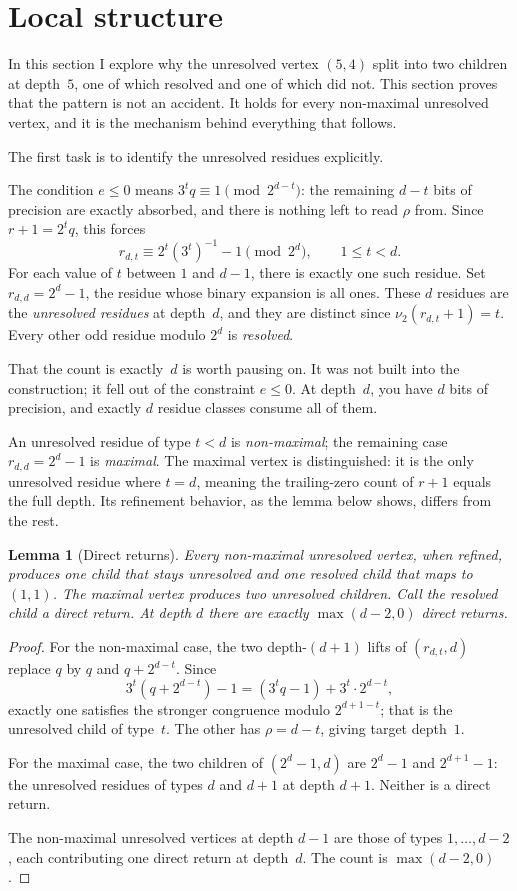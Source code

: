 \documentclass[11pt]{amsart}
\newtheorem{lemma}[theorem]{Lemma}
\theoremstyle{definition}
\theoremstyle{remark}
\newcommand{\nuu}{\nu_2}
\begin{document}
\section{Local structure}\label{sec:local}
In this section I explore why the unresolved vertex $(5,4)$ split into two children at depth~$5$, one of which resolved and one of which did not. This section proves that the pattern is not an accident.  It holds for every non-maximal unresolved vertex, and it is the mechanism behind everything that follows.

The first task is to identify the unresolved residues explicitly.

The condition $e\le0$ means $3^tq\equiv1\pmod{2^{d-t}}$: the
remaining $d-t$ bits of precision are exactly absorbed, and there is
nothing left to read $\rho$ from.  Since $r+1=2^tq$, this forces
\[
r_{d,t}\equiv 2^t(3^t)^{-1}-1\pmod{2^d},
\qquad 1\le t<d.
\]
For each value of $t$ between $1$ and $d-1$, there is exactly one such residue.  Set $r_{d,d}=2^d-1$, the residue whose binary expansion is all ones.  These $d$ residues are the \emph{unresolved residues} at depth~$d$, and they are distinct since
$\nuu(r_{d,t}+1)=t$.  Every other odd residue modulo $2^d$ is \emph{resolved}.

That the count is exactly~$d$ is worth pausing on.  It was not built into the construction; it fell out of the constraint $e\le0$.  At depth~$d$, you have $d$ bits of precision, and exactly $d$ residue classes consume all of them.

An unresolved residue of type $t<d$ is \emph{non-maximal}; the
remaining case $r_{d,d}=2^d-1$ is \emph{maximal}.  The maximal vertex is distinguished: it is the only unresolved residue where $t=d$, meaning the trailing-zero count of $r+1$ equals the full depth.  Its refinement behavior, as the lemma below shows, differs from the rest.

\begin{lemma}[Direct returns]\label{lem:directreturns}
Every non-maximal unresolved vertex, when refined, produces one child
that stays unresolved and one resolved child that maps to $(1,1)$.
The maximal vertex produces two unresolved children.
Call the resolved child a \emph{direct return}.  At depth $d$ there are
exactly $\max(d-2,0)$ direct returns.
\end{lemma}

\begin{proof}
For the non-maximal case, the two depth-$(d+1)$ lifts of
$(r_{d,t},d)$ replace $q$ by $q$ and $q+2^{d-t}$.  Since
\[
3^t(q+2^{d-t})-1=(3^tq-1)+3^t\cdot 2^{d-t},
\]
exactly one satisfies the stronger congruence modulo $2^{d+1-t}$;
that is the unresolved child of type~$t$.  The other has $\rho=d-t$,
giving target depth~$1$.

For the maximal case, the two children of $(2^d-1,d)$ are $2^d-1$ and
$2^{d+1}-1$: the unresolved residues of types $d$ and $d+1$ at
depth $d+1$.  Neither is a direct return.

The non-maximal unresolved vertices at depth $d-1$ are those of types
$1,\ldots,d-2$, each contributing one direct return at depth~$d$.
The count is $\max(d-2,0)$.
\end{proof}
\end{document}
